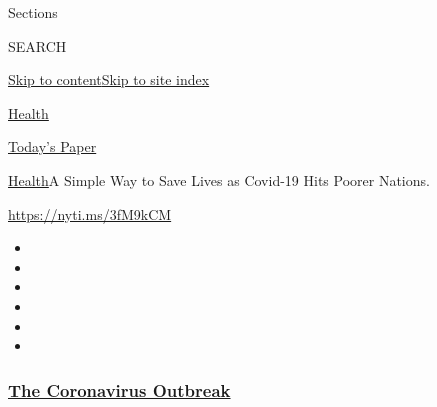 Sections

SEARCH

\protect\hyperlink{site-content}{Skip to
content}\protect\hyperlink{site-index}{Skip to site index}

\href{https://www.nytimes3xbfgragh.onion/section/health}{Health}

\href{https://myaccount.nytimes3xbfgragh.onion/auth/login?response_type=cookie\&client_id=vi}{}

\href{https://www.nytimes3xbfgragh.onion/section/todayspaper}{Today's
Paper}

\href{/section/health}{Health}\textbar{}A Simple Way to Save Lives as
Covid-19 Hits Poorer Nations.

\url{https://nyti.ms/3fM9kCM}

\begin{itemize}
\item
\item
\item
\item
\item
\item
\end{itemize}

\hypertarget{the-coronavirus-outbreak}{%
\subsubsection{\texorpdfstring{\href{https://www.nytimes3xbfgragh.onion/news-event/coronavirus?name=styln-coronavirus-national\&region=TOP_BANNER\&block=storyline_menu_recirc\&action=click\&pgtype=Article\&impression_id=13887c50-f1c3-11ea-9feb-8792ec8b6371\&variant=undefined}{The
Coronavirus
Outbreak}}{The Coronavirus Outbreak}}\label{the-coronavirus-outbreak}}

